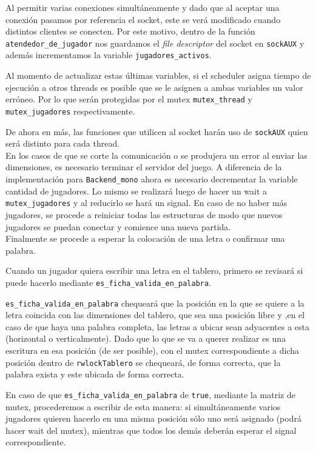 Al permitir varias conexiones simultáneamente y dado que al aceptar una conexión pasamos por referencia el socket, este se ver\'a modificado cuando distintos clientes se conecten. Por este motivo, dentro de la función \texttt{atendedor\_de\_jugador} nos guardamos el \textit{file descriptor} del socket en \texttt{sockAUX} y además incrementamos la variable \texttt{jugadores\_activos}. 

Al momento de actualizar estas \'ultimas variables, si el scheduler asigna tiempo de ejecución a otros threads es posible que se le asignen a ambas variables un valor erróneo. Por lo que serán protegidas por el mutex \texttt{mutex\_thread} y \texttt{mutex\_jugadores} respectivamente. 

De ahora en m\'as, las funciones que utilicen al socket harán uso de \texttt{sockAUX} quien ser\'a distinto para cada thread.\\

En los casos de que se corte la comunicación o se produjera un error al enviar las dimensiones, es necesario terminar el servidor del juego. A diferencia de la implementación para \texttt{Backend\_mono} ahora es necesario decrementar la variable cantidad de jugadores. Lo mismo se realizar\'a luego de hacer un wait a \texttt{mutex\_jugadores} y al reducirlo se hará un signal. En caso de no haber m\'as jugadores, se procede a reiniciar todas las estructuras de modo que nuevos jugadores se puedan conectar y comience una nueva partida.\\

Finalmente se procede a esperar la colocación de una letra o confirmar una palabra.

Cuando un jugador quiera escribir una letra en el tablero, primero se revisar\'a si puede hacerlo mediante \texttt{es\_ficha\_valida\_en\_palabra}.  

\texttt{es\_ficha\_valida\_en\_palabra} chequear\'a que la posición en la que se quiere a la letra coincida con las dimensiones del  tablero, que sea una posición libre y ,en el caso de que haya una palabra completa, las letras a ubicar sean adyacentes a esta (horizontal o verticalmente). Dado que lo que se va a querer realizar es una escritura en esa posición (de ser posible), con el mutex correspondiente a dicha posición dentro de \texttt{rwlockTablero}  se chequear\'a, de forma correcta, que la palabra exista y este ubicada de forma correcta. 

En caso de que \texttt{es\_ficha\_valida\_en\_palabra} de \texttt{true}, mediante la matriz de mutex, procederemos a escribir de esta manera: si simultáneamente varios jugadores quieren hacerlo en una misma posición s\'olo uno ser\'a asignado (podrá hacer wait del mutex), mientras que todos los demás deberán esperar el signal correspondiente. 

